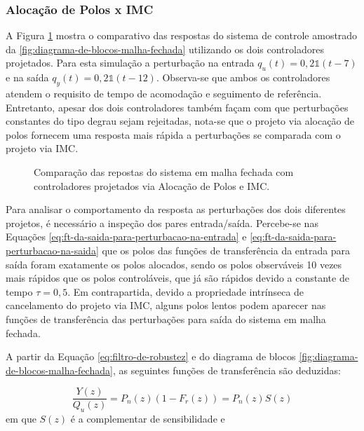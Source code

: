 \subsubsection{Alocação de Polos x IMC}

A Figura \ref{fig:comparacao-entre-imc-e-alocacao-de-polos} mostra o comparativo
das respostas do sistema de controle amostrado da
\ref{fig:diagrama-de-blocos-malha-fechada} utilizando os dois controladores
projetados. Para esta simulação a perturbação na entrada $q_u(t) =
0,2\mathds{1}(t - 7)$ e na saída $q_y(t) = 0,2\mathds{1}(t - 12)$. Observa-se
que ambos os controladores atendem o requisito de tempo de acomodação e
seguimento de referência. Entretanto, apesar dos dois controladores também façam
com que perturbações constantes do tipo degrau sejam rejeitadas, nota-se que o
projeto via alocação de polos fornecem uma resposta mais rápida a perturbações
se comparada com o projeto via IMC.

\begin{figure}[!ht]
    \caption{Comparação das repostas do sistema em malha fechada com
    controladores projetados via Alocação de Polos e IMC.}
    \vspace{-10pt}
    \hspace{-30pt}
    \label{fig:comparacao-entre-imc-e-alocacao-de-polos}
    \begin{minipage}{\linewidth}
        
    \end{minipage}
\end{figure}

Para analisar o comportamento da resposta as perturbações dos dois diferentes
projetos, é necessário a inspeção dos pares entrada/saída. Percebe-se nas
Equações \ref{eq:ft-da-saida-para-perturbacao-na-entrada} e
\ref{eq:ft-da-saida-para-perturbacao-na-saida} que os polos das funções de
transferência da entrada para saída foram exatamente os polos alocados, sendo os
polos observáveis 10 vezes mais rápidos que os polos controláveis, que já são
rápidos devido a constante de tempo $\tau = 0,5$. Em contrapartida, devido a
propriedade intrínseca de cancelamento do projeto via IMC, alguns polos lentos
podem aparecer nas funções de transferência das perturbações para saída do
sistema em malha fechada.

A partir da Equação \ref{eq:filtro-de-robustez} e do diagrama de blocos
\ref{fig:diagrama-de-blocos-malha-fechada}, as seguintes funções de
transferência são deduzidas:

\begin{equation}
    \label{eq:ft-perturbacao-entrada-imc}
    \frac{Y(z)}{Q_u(z)} = P_n(z)(1-F_r(z)) = P_n(z)S(z)
\end{equation} em que $S(z)$ é a complementar de sensibilidade e

